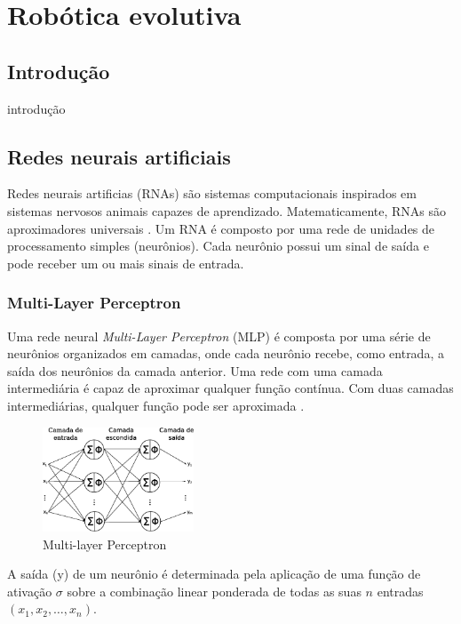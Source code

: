 \chapter{Robótica evolutiva}
\label{evolutiva}

\section{Introdução}

introdução

\section{Redes neurais artificiais}

Redes neurais artificias (RNAs) são sistemas computacionais inspirados em sistemas
nervosos animais capazes de aprendizado. Matematicamente, RNAs são aproximadores
universais \cite{hornik1989universal}. Um RNA é composto por uma rede de unidades
de processamento simples (neurônios). Cada neurônio possui um sinal de saída e
pode receber um ou mais sinais de entrada.

\subsection{Multi-Layer Perceptron}

Uma rede neural \textit{Multi-Layer Perceptron} (MLP) é composta por uma série de neurônios organizados em camadas, onde cada neurônio recebe, como entrada, a saída dos neurônios da camada anterior. Uma rede com uma camada intermediária é capaz de aproximar qualquer função contínua. Com duas camadas intermediárias, qualquer função pode ser aproximada \cite{cybenko1989mlp}.

\begin{figure}[h]
    \centering
    \includegraphics[width=0.4\textwidth]{figures/mlp}
    \caption{Multi-layer Perceptron}
    \label{fig:mlp}
\end{figure}

A saída (y) de um neurônio é determinada pela aplicação de uma função de ativação \(\sigma\) sobre a combinação linear ponderada de todas as suas \(n\) entradas \((x_1, x_2, \dots , x_n)\).

